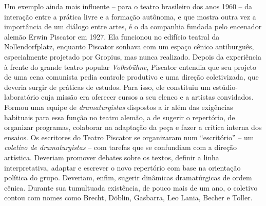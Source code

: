 Um exemplo ainda mais influente -- para o teatro brasileiro dos anos 1960
-- da interação entre a prática livre e a formação autônoma, e
que mostra outra vez a importância de um diálogo entre artes, é o da
companhia fundada pelo encenador alemão Erwin Piscator em 1927. Ela
funcionou no edifício teatral da Nollendorfplatz, enquanto Piscator
sonhava com um espaço cênico antiburguês, especialmente projetado por
Gropius, mas nunca realizado. Depois da experiência à frente do grande
teatro popular {\it Volksbühne}, Piscator entendia que seu projeto de
uma cena comunista pedia controle produtivo e uma direção coletivizada,
que deveria surgir de práticas de estudos. Para isso, ele constituiu um
estúdio-laboratório cuja missão era oferecer cursos a seu elenco e
a artistas convidados. Formou uma equipe de {\it dramaturgistas}
dispostos a ir além das exigências habituais para essa função no
teatro alemão, a de sugerir o repertório, de organizar programas,
colaborar na adaptação da peça e fazer a crítica interna dos ensaios.
Os escritores do Teatro Piscator se organizaram num “escritório” -- um
{\it coletivo de dramaturgistas} -- com tarefas que se confundiam com a
direção artística. Deveriam promover debates sobre os textos, definir a
linha interpretativa, adaptar e escrever o novo repertório com base na
orientação política do grupo. Deveriam, enfim, sugerir dinâmicas dramatúrgicas
de ordem cênica. Durante sua tumultuada existência, de pouco mais de um ano,
o coletivo contou com nomes como Brecht, Döblin, Gasbarra, Leo Lania,
Becher e Toller.


